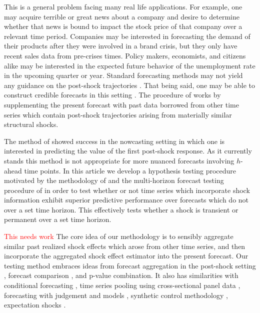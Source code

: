 \documentclass[11pt]{article}
\theoremstyle{definition}
\begin{document}
This is a general problem facing many real life applications. For example, one may acquire terrible or great news about a company and desire to determine whether that news is bound to impact the stock price of that company over a relevant time period.  Companies may be interested in forecasting the demand of their products after they were involved in a brand crisis, but they only have recent sales data from pre-crises times. Policy makers, economists, and citizens alike may be interested in the expected future behavior of the unemployment rate in the upcoming quarter or year. %
Standard forecasting methods may not yield any guidance on the post-shock trajectories \citep{baumeister2014real}. That being said, one may be able to construct credible forecasts in this setting \citep{lin2021minimizing}. The procedure of \cite{lin2021minimizing} works by supplementing the present forecast with past data borrowed from other time series which contain post-shock trajectories arising from materially similar structural shocks.

The method of \cite{lin2021minimizing} showed success in the nowcasting setting in which one is interested in predicting the value of the first post-shock response. As it currently stands this method is not appropriate for more nuanced forecasts involving $h$-ahead time points. In this article we develop a  hypothesis testing procedure motivated by the methodology of \cite{lin2021minimizing} and the multi-horizon forecast testing procedure of \cite{quaedvlieg2021multi} in order to test whether or not time series which incorporate shock information exhibit superior predictive performance over forecasts which do not over a set time horizon. This effectively tests whether a shock is transient or permanent over a set time horizon.


\textcolor{red}{This needs work} The core idea of our methodology is to sensibly aggregate similar past realized shock effects which arose from other time series, and then incorporate the aggregated shock effect estimator into the present forecast. Our testing method embraces ideas from 
forecast aggregation in the post-shock setting \citep{lin2021minimizing}, 
forecast comparison \citep{diebold1995comparing, quaedvlieg2021multi}, 
and p-value combination. 
It also has similarities with 
conditional forecasting \citep{baumeister2014real, kilian2017structural}, 
time series pooling using cross-sectional panel data \citep{ramaswamy1993empirical, pesaran1999pooled, hoogstrate2000pooling, baltagi2008forecasting, koop2012forecasting, liu2020forecasting},
forecasting with judgement and models \citep{svensson2005monetary, monti2008forecast}, 
synthetic control methodology \citep{abadie2010synthetic, agarwal2020two},  
expectation shocks \citep{croushore2006data, baumeister2014general, clements2019measuring}.
\end{document}
